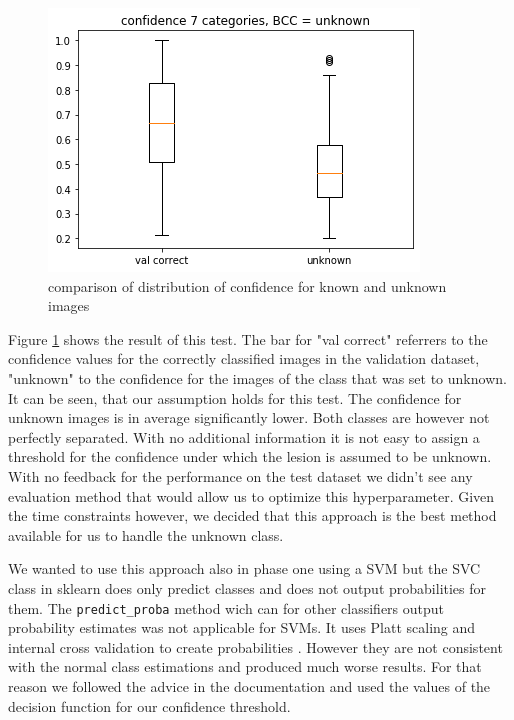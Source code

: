 \begin{figure}[h]
    \centering
    \includegraphics[width=.75\linewidth]{pictures/box_unknown.png}  
    \caption{comparison of distribution of confidence for known and unknown images}
    \label{fig:box_unknown}
\end{figure}
Figure \ref{fig:box_unknown} shows the result of this test. The bar for "val correct" referrers to the confidence values for the correctly classified images in the validation dataset, "unknown" to the confidence for the images of the class that was set to unknown. It can be seen, that our assumption holds for this test. The confidence for unknown images is in average significantly lower. Both classes are however not perfectly separated. With no additional information it is not easy to assign a threshold for the confidence under which the lesion is assumed to be unknown. With no feedback for the performance on the test dataset we didn't see any evaluation method that would allow us to optimize this hyperparameter. 
Given the time constraints however, we decided that this approach is the best method available for us to handle the unknown class. 

We wanted to use this approach also in phase one using a SVM but the SVC class in sklearn does only predict classes and does not output probabilities for them. The \verb|predict_proba| method wich can for other classifiers output probability estimates was not applicable for SVMs. It uses Platt scaling and internal cross validation to create probabilities \cite{scikit-learn}. However they are not consistent with the normal class estimations and produced much worse results. For that reason we followed the advice in the documentation and used the values of the decision function for our confidence threshold. 

